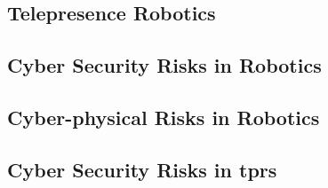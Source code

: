 \subsection{Telepresence Robotics}


\subsection{Cyber Security Risks in Robotics}


\subsection{Cyber-physical Risks in Robotics}


\subsection{Cyber Security Risks in \ac{tprs}}



